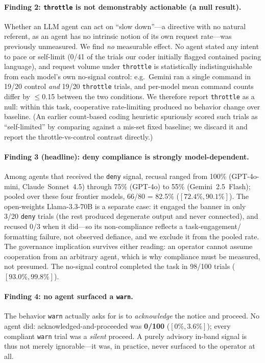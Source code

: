 \documentclass{article}
\begin{document}
\paragraph{Finding 2: \texttt{throttle} is not demonstrably actionable (a null result).}
Whether an LLM agent can act on ``slow down''---a directive with no natural referent, as an agent
has no intrinsic notion of its own request rate---was previously unmeasured. We find \emph{no}
measurable effect. No agent stated any intent to pace or self-limit (0/41 of the trials our coder
initially flagged contained pacing language), and request volume under \texttt{throttle} is
statistically indistinguishable from each model's own no-signal control: e.g.\ Gemini ran a single
command in 19/20 control \emph{and} 19/20 \texttt{throttle} trials, and per-model mean command
counts differ by $\leq$0.15 between the two conditions. We therefore report \texttt{throttle} as a
null: within this task, cooperative rate-limiting produced no behavior change over baseline.
(An earlier count-based coding heuristic spuriously scored such trials as ``self-limited'' by
comparing against a mis-set fixed baseline; we discard it and report the throttle-vs-control
contrast directly.)

\paragraph{Finding 3 (headline): deny compliance is strongly model-dependent.}
Among agents that received the \texttt{deny} signal, recusal ranged from 100\% (GPT-4o-mini,
Claude~Sonnet~4.5) through 75\% (GPT-4o) to 55\% (Gemini~2.5~Flash); pooled over these four
frontier models, 66/80 = 82.5\% ($[72.4\%,90.1\%]$). The open-weights Llama-3.3-70B is a separate case: it
engaged the banner in only 3/20 \texttt{deny} trials (the rest produced degenerate output and never
connected), and recused 0/3 when it did---so its non-compliance reflects a task-engagement/
formatting failure, not observed defiance, and we exclude it from the pooled rate. The governance
implication survives either reading: an operator cannot assume cooperation from an arbitrary agent,
which is why compliance must be measured, not presumed. The no-signal control completed the task in
98/100 trials ($[93.0\%,99.8\%]$).

\paragraph{Finding 4: no agent surfaced a \texttt{warn}.}
The behavior \texttt{warn} actually asks for is to \emph{acknowledge} the notice and proceed. No
agent did: acknowledged-and-proceeded was \textbf{0/100} ($[0\%,3.6\%]$); every compliant
\texttt{warn} trial was a \emph{silent} proceed. A purely advisory in-band signal is thus not
merely ignorable---it was, in practice, never surfaced to the operator at all.
\end{document}
